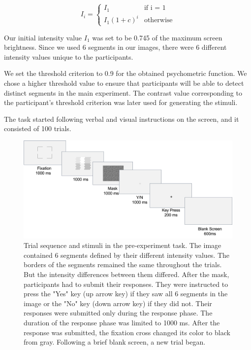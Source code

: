 \documentclass{article}
\begin{document}
\begin{equation}\label{calcInt}
    I_i = 
    \begin{cases}
        I_1 & \text{if i = 1} \\ 
        I_{1}(1 + c)^{i} & \text{otherwise}
    \end{cases}
\end{equation}

Our initial intensity value $I_1$ was set to be 0.745 of the maximum screen brightness. Since we used 6 segments in our images, there were 6 different intensity values unique to the participants.

We set the threshold criterion to 0.9 for the obtained psychometric function. We chose a higher threshold value to ensure that participants will be able to detect distinct segments in the main experiment. The contrast value corresponding to the participant's threshold criterion was later used for generating the stimuli.

The task started following verbal and visual instructions on the screen, and it consisted of 100 trials.

\begin{figure}
    \centering
    \includegraphics[width=\textwidth]{images/thr_exp_procedure.png}
    \caption{Trial sequence and stimuli in the pre-experiment task. The image contained 6 segments defined by their different intensity values. The borders of the segments remained the same throughout the trials. But the intensity differences between them differed. After the mask, participants had to submit their responses.
    They were instructed to press the "Yes" key (up arrow key) if they saw all 6 segments in the image or the "No" key (down arrow key) if they did not. Their responses were submitted only during the response phase. The duration of the response phase was limited to 1000 ms. After the response was submitted, the fixation cross changed its color to black from gray. Following a brief blank screen, a new trial began.}
    \label{fig:thr_exp_procedure}
\end{figure}
\end{document}
